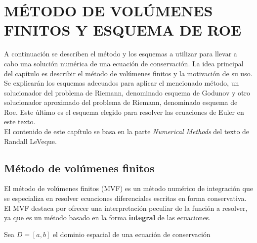 \chapter{MÉTODO DE VOLÚMENES FINITOS Y ESQUEMA DE ROE}
A continuación se describen el método y los esquemas a utilizar para llevar a cabo una solución numérica de una ecuación de conservación. La idea principal del capítulo es describir el método de volúmenes finitos y la motivación de su uso. Se explicarán los esquemas adecuados para aplicar el mencionado método, un solucionador del problema de Riemann, denominado esquema de Godunov y otro solucionador aproximado del problema de Riemann, denominado esquema de Roe. Este último es el esquema elegido para resolver las ecuaciones de Euler en este texto.\\
El contenido de este capítulo se basa en la parte \textit{Numerical Methods} del texto \cite{Leveque} de Randall LeVeque.

\section{Método de volúmenes finitos}
El método de volúmenes finitos (MVF) es un método numérico de integración que se especializa en resolver ecuaciones diferenciales escritas en forma conservativa. El MVF destaca por ofrecer una interpretación peculiar de la función a resolver, ya que es un método basado en la forma \textbf{integral} de las ecuaciones.

Sea $D = [a,b]$ el dominio espacial de una ecuación de conservación





%
